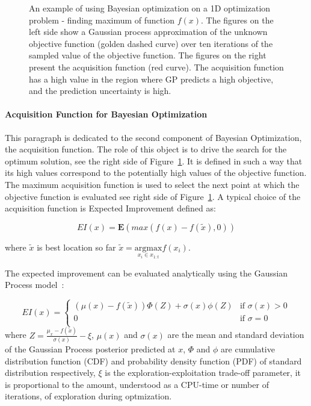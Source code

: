 \begin{figure}[!ht]
\caption{An example of using Bayesian optimization on a 1D optimization problem - finding maximum of function $f(x)$. 
The figures on the left side show a Gaussian process approximation of the unknown objective function (golden dashed curve) over ten iterations of the sampled value of the objective function. The figures on the right present the acquisition function (red curve). The acquisition function has a high value in the region where GP predicts a high objective, and the prediction uncertainty is high. 
\label{fig:BO}}
\end{figure}

\paragraph{ Acquisition Function for Bayesian Optimization} \mbox{}

This paragraph is dedicated to the second component of Bayesian Optimization, the acquisition function. The role of this object is to drive the search for the optimum solution, see the right side of Figure~\ref{fig:BO}. It is defined in such a way that its high values correspond to the potentially high values of the objective function. The maximum acquisition function is used to select the next point at which the objective function is evaluated see right side of Figure~\ref{fig:BO}. A typical choice of the acquisition function is Expected Improvement defined as: 

\begin{equation}
    EI(x) = \mathbf{E}\left(max( f(x)-f(\widetilde{x}) , 0) \right) 
\end{equation}

where $\widetilde{x}$ is best location so far $\widetilde{x} = \underset{{x_i \in x_{1:t}}}{\mathrm{argmax}} f(x_i)$. 

The expected improvement can be evaluated analytically using the Gaussian Process model~\cite{GaussianProcesses}: 

\begin{equation}
    EI(x) =   \left\{ \begin{array}{ll}
(\mu(x)-f(\widetilde{x}))\Phi(Z) + \sigma(x)\phi(Z) & \textrm{if $\sigma(x)>0$}\\
0 & \textrm{if  $\sigma=0$}\\
\end{array} \right.
\end{equation}
where $Z= \frac{\mu_{x}-f(\widetilde{x})}{\sigma(x)}-\xi$, $\mu(x)$ and $\sigma(x)$ are the mean and standard deviation of the Gaussian Process posterior predicted at $x$, $\Phi$ and $\phi$ are cumulative distribution function (CDF) and probability density function (PDF) of standard distribution respectively, $\xi$ is the exploration-exploitation trade-off parameter, it is proportional to the amount, understood as a CPU-time or number of iterations, of exploration during optmization. 

